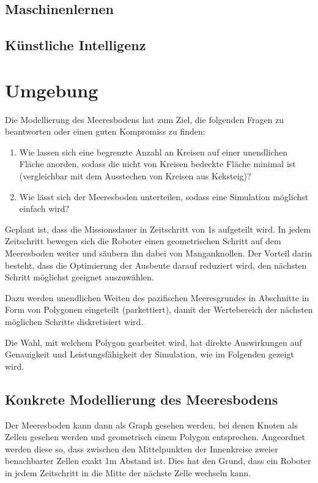 \documentclass{article}
\begin{document}
\subsection{Maschinenlernen}

\subsection{Künstliche Intelligenz}



\clearpage
\section{Umgebung}

Die Modellierung des Meeresbodens hat zum Ziel, die folgenden 
Fragen zu beantworten oder einen guten Kompromiss zu finden:

\begin{enumerate}
\item Wie lassen sich eine begrenzte Anzahl an Kreisen auf einer 
unendlichen Fläche anorden, sodass die nicht von Kreisen bedeckte Fläche minimal 
ist (vergleichbar mit dem Ausstechen von Kreisen aus Keksteig)?
\item Wie lässt sich der Meeresboden unterteilen, sodass eine Simulation
möglichst einfach wird?
\end{enumerate}

Geplant ist, dass die Missionsdauer in Zeitschritt von 1s aufgeteilt wird.
In jedem Zeitschritt bewegen sich die Roboter einen geometrischen Schritt
auf dem Meeresboden weiter und säubern ihn dabei von Manganknollen. Der Vorteil
darin besteht, dass die Optimierung der Ausbeute darauf reduziert wird, 
den nächsten Schritt möglichst geeignet auszuwählen.

Dazu werden unendlichen Weiten des pazifischen Meeresgrundes
in Abschnitte in Form von Polygonen eingeteilt (parkettiert),
damit der Wertebereich der nächsten möglichen Schritte diskretisiert wird.

Die Wahl, mit welchem Polygon gearbeitet wird, hat direkte
Auswirkungen auf Genauigkeit und Leistungsfähigkeit der 
Simulation, wie im Folgenden gezeigt wird.

\subsection{Konkrete Modellierung des Meeresbodens}

Der Meeresboden kann dann als Graph gesehen werden, bei denen Knoten 
als Zellen gesehen werden und geometrisch einem Polygon entsprechen. 
Angeordnet werden diese so, dass zwischen den Mittelpunkten der Innenkreise
zweier benachbarter Zellen exakt 1m Abstand ist. Dies hat den Grund, dass 
ein Roboter in jedem Zeitschritt in die Mitte der nächste Zelle wechseln kann.
\end{document}
